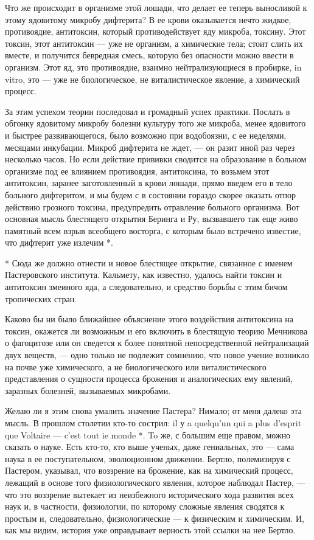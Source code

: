 Что  же происходит  в  организме  этой лошади,  что  делает ее  теперь
выносливой к этому ядовитому микробу дифтерита? В ее крови оказывается
нечто  жидкое, противоядие,  антитоксин, который  противодействует яду
микроба, токсину.  Этот токсин, этот  антитоксин --- уже  не организм,
а  химические  тела; стоит  слить  их  вместе, и  получится  бевредная
смесь, которую  без опасности  можно ввести в  организм. Этот  яд, это
противоядие,  взаимно  нейтрализующиеся  в  пробирке,  in  vitro,  это
---  уже не  биологическое, не  виталистическое явление,  а химический
процесс.

За этим успехом теории последовал  и громадный успех практики. Послать
в обгонку  ядовитому микробу болезни  культуру того же  микроба, менее
ядовитого и быстрее развивающегося, было возможно при водобоязни, с ее
неделями, месяцами инкубации.  Микроб дифтерита не ждет,  --- он разит
иной раз  через несколько  часов. Но  если действие  прививки сводится
на  образование  в  больном  организме под  ее  влиянием  противоядия,
антитоксина,  то  возьмем  этот антитоксин,  заранее  заготовленный  в
крови  лошади, прямо  введем  его  в тело  больного  дифтеритом, и  мы
будем с  в состоянии  гораздо скорее  оказать отпор  действию грозного
токсина,  предупредить  отравление  больного организма.  Вот  основная
мысль  блестящего  открытия Беринга  и  Ру,  вызвавшего так  еще  живо
памятный  всем  взрыв всеобщего  восторга,  с  которым было  встречено
известие, что дифтерит уже излечим *.

*  Сюда же  должно отнести  и  новое блестящее  открытие, связанное  с
именем Пастеровского института. Кальмету,  как известно, удалось найти
токсин и антитоксин змеиного яда, а следовательно, и средство борьбы с
этим бичом тропических стран.

Каково бы  ни было ближайшее объяснение  этого воздействия антитоксина
на  токсин,  окажется   ли  возможным  и  его   включить  в  блестящую
теорию  Мечникова  о  фагоцитозе  или он  сведется  к  более  понятной
непосредственной  нейтрализаций  двух  веществ,  ---  одно  только  не
подлежит сомнению, что новое учение возникло на почве уже химического,
а  не биологического  или  виталистического  представления о  сущности
процесса  брожения и  аналогических  ему  явлений, заразных  болезней,
вызываемых микробами.

Желаю ли я этим снова умалить значение Пастера? Нимало; от меня далеко
эта мысль. В  прошлом столетии кто-то сострил: il у  a quelqu'un qui a
plus  d'esprit que  Voltaire  --- c'est  tout  ie monde  *.  To же,  с
большим  еще правом,  можно сказать  о  науке. Есть  кто-то, кто  выше
ученых,  даже гениальных,  это  --- сама  наука  в ее  поступательном,
эволюционном движении.  Бертло, полемизируя с Пастером,  указывал, что
воззрение на  брожение, как  на химический  процесс, лежащий  в основе
того физиологического  явления, которое  наблюдал Пастер, ---  что это
воззрение  вытекает из  неизбежного исторического  хода развития  всех
наук и, в частности, физиологии,  по которому сложные явления сводятся
к  простым  и,  следовательно,  физиологические  ---  к  физическим  и
химическим. И,  как мы  видим, история  уже оправдывает  верность этой
ссылки на нее Бертло.

